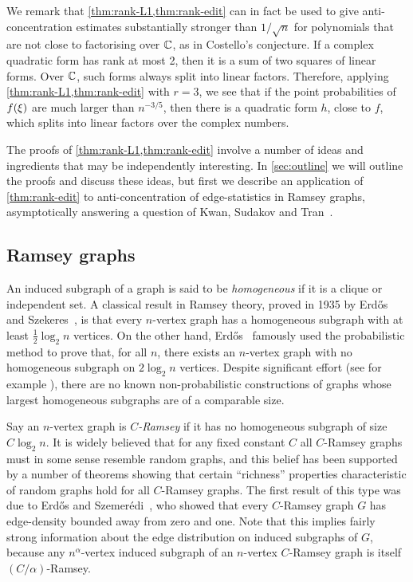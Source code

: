 \documentclass{daj}
\theoremstyle{plain}
\theoremstyle{plain}
\theoremstyle{plain}
\theoremstyle{plain}
\theoremstyle{definition}
\theoremstyle{plain}
\theoremstyle{plain}
\theoremstyle{definition}
\theoremstyle{definition}
\theoremstyle{plain}
\let\originalleft\left
\let\originalright\right
\renewcommand{\left}{\mathopen{}\mathclose\bgroup\originalleft}
\renewcommand{\right}{\aftergroup\egroup\originalright}
\begin{document}
We remark that \cref{thm:rank-L1,thm:rank-edit} can in fact be used to
give anti-concentration estimates substantially stronger than $1/\sqrt{n}$ for
polynomials that are not close to factorising over $\mathbb{C}$, as in Costello's
conjecture. If a complex quadratic form has rank at most 2, then it is a sum of two squares of linear forms. Over $\mathbb{C}$, such forms
always split into linear factors. Therefore, applying \cref{thm:rank-L1,thm:rank-edit}
with $r=3$, we see that if the point probabilities of $f\left(\xi\right)$
are much larger than $n^{-3/5}$, then there is a quadratic form $h$,
close to $f$, which splits into linear factors over the complex numbers.

The proofs of \cref{thm:rank-L1,thm:rank-edit} involve a number of ideas and ingredients that may be independently interesting. In \cref{sec:outline} we will outline the proofs and discuss these ideas, but first we describe an application of \cref{thm:rank-edit} to anti-concentration of edge-statistics in Ramsey graphs, asymptotically answering a question of Kwan, Sudakov and Tran~\cite{KST}.

\subsection{Ramsey graphs}

An induced subgraph of a graph is said to be \emph{homogeneous} if
it is a clique or independent set. A classical result in Ramsey theory,
proved in 1935 by Erd\H os and Szekeres~\cite{ES35}, is that every
$n$-vertex graph has a homogeneous subgraph with at least $\frac{1}{2}\log_{2}n$
vertices. On the other hand, Erd\H os~\cite{Erd47} famously used
the probabilistic method to prove that, for all $n$, there exists
an $n$-vertex graph with no homogeneous subgraph on $2\log_{2}n$
vertices. Despite significant effort (see for example \cite{BRSW12,CZ16,Coh16,FW81,Li18}),
there are no known non-probabilistic constructions of graphs whose largest homogeneous subgraphs are of a comparable size.

Say an $n$-vertex graph is \emph{$C$-Ramsey} if it has no homogeneous
subgraph of size $C\log_{2}n$. It is widely believed that for any fixed constant $C$ all $C$-Ramsey graphs must in some sense resemble random graphs, and this belief has been supported by a number of theorems showing that certain ``richness'' properties characteristic of random graphs hold for all $C$-Ramsey graphs. The first result of this type was due to Erd\H os and Szemer\'edi~\cite{ES72}, who showed that every $C$-Ramsey graph $G$ has edge-density bounded away from zero and one. Note that this implies fairly strong information about the edge distribution on induced subgraphs of $G$, because any $n^{\alpha}$-vertex induced subgraph of an $n$-vertex $C$-Ramsey graph is itself $(C/\alpha)$-Ramsey.
\end{document}
